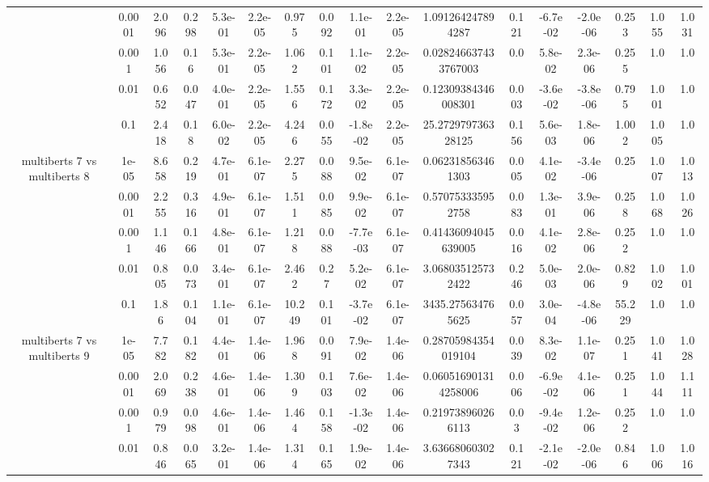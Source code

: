 \begin{tabular}{|c|c|c|c|c|c|c|c|c|c|c|c|c|c|c|c|c|}
 & 0.0001 & 2.096 & 0.298 & 5.3e-01 & 2.2e-05 & 0.975 & 0.092 & 1.1e-01 & 2.2e-05 & 1.091264247894287 & 0.121 & -6.7e-02 & -2.0e-06 & 0.253 & 1.055 & 1.031 \\
 & 0.001 & 1.056 & 0.16 & 5.3e-01 & 2.2e-05 & 1.062 & 0.101 & 1.1e-02 & 2.2e-05 & 0.028246637433767003 & 0.0 & 5.8e-02 & 2.3e-06 & 0.255 & 1.0 & 1.0 \\
 & 0.01 & 0.652 & 0.047 & 4.0e-01 & 2.2e-05 & 1.556 & 0.172 & 3.3e-02 & 2.2e-05 & 0.12309384346008301 & 0.003 & -3.6e-02 & -3.8e-06 & 0.795 & 1.001 & 1.0 \\
 & 0.1 & 2.418 & 0.18 & 6.0e-02 & 2.2e-05 & 4.246 & 0.055 & -1.8e-02 & 2.2e-05 & 25.272979736328125 & 0.156 & 5.6e-03 & 1.8e-06 & 1.002 & 1.005 & 1.0 \\
\hline
\multirow{5}{*}{multiberts 7 vs multiberts 8} & 1e-05 & 8.658 & 0.219 & 4.7e-01 & 6.1e-07 & 2.275 & 0.088 & 9.5e-02 & 6.1e-07 & 0.062318563461303 & 0.005 & 4.1e-02 & -3.4e-06 & 0.25 & 1.007 & 1.013 \\
 & 0.0001 & 2.255 & 0.316 & 4.9e-01 & 6.1e-07 & 1.511 & 0.085 & 9.9e-02 & 6.1e-07 & 0.570753335952758 & 0.083 & 1.3e-01 & 3.9e-06 & 0.258 & 1.068 & 1.026 \\
 & 0.001 & 1.146 & 0.166 & 4.8e-01 & 6.1e-07 & 1.218 & 0.088 & -7.7e-03 & 6.1e-07 & 0.41436094045639005 & 0.016 & 4.1e-02 & 2.8e-06 & 0.252 & 1.0 & 1.0 \\
 & 0.01 & 0.805 & 0.073 & 3.4e-01 & 6.1e-07 & 2.462 & 0.27 & 5.2e-02 & 6.1e-07 & 3.068035125732422 & 0.246 & 5.0e-03 & 2.0e-06 & 0.829 & 1.002 & 1.001 \\
 & 0.1 & 1.86 & 0.104 & 1.1e-01 & 6.1e-07 & 10.249 & 0.101 & -3.7e-02 & 6.1e-07 & 3435.275634765625 & 0.057 & 3.0e-04 & -4.8e-06 & 55.229 & 1.0 & 1.0 \\
\hline
\multirow{5}{*}{multiberts 7 vs multiberts 9} & 1e-05 & 7.782 & 0.182 & 4.4e-01 & 1.4e-06 & 1.968 & 0.091 & 7.9e-02 & 1.4e-06 & 0.28705984354019104 & 0.039 & 8.3e-02 & 1.1e-07 & 0.251 & 1.041 & 1.028 \\
 & 0.0001 & 2.069 & 0.238 & 4.6e-01 & 1.4e-06 & 1.309 & 0.103 & 7.6e-02 & 1.4e-06 & 0.060516901314258006 & 0.006 & -6.9e-02 & 4.1e-06 & 0.251 & 1.044 & 1.111 \\
 & 0.001 & 0.979 & 0.098 & 4.6e-01 & 1.4e-06 & 1.464 & 0.158 & -1.3e-02 & 1.4e-06 & 0.219738960266113 & 0.03 & -9.4e-02 & 1.2e-06 & 0.252 & 1.0 & 1.0 \\
 & 0.01 & 0.846 & 0.065 & 3.2e-01 & 1.4e-06 & 1.314 & 0.165 & 1.9e-02 & 1.4e-06 & 3.636680603027343 & 0.121 & -2.1e-02 & -2.0e-06 & 0.846 & 1.006 & 1.016 \\

\end{tabular}
